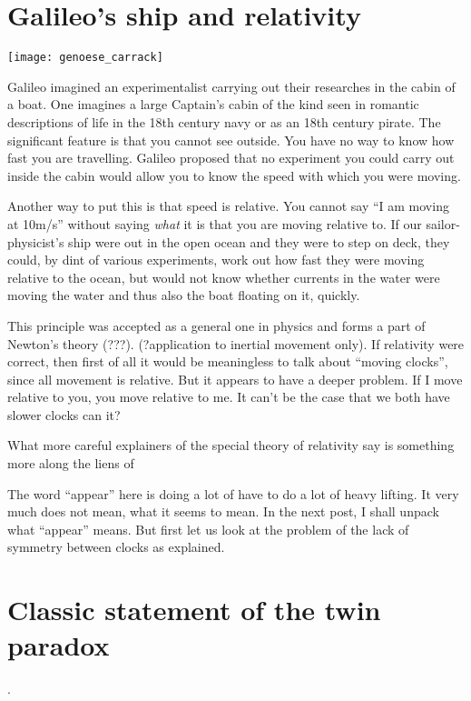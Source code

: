 \documentclass{report}
\begin{document}
\section{Galileo's ship and relativity}
\texttt{[image: genoese\_carrack]}

Galileo imagined an experimentalist carrying out their researches in the cabin of a boat. One imagines a large Captain's cabin of the kind seen in romantic descriptions of life in the 18th century navy or as an 18th century pirate. The significant feature is that you cannot see outside. You have no way to know how fast you are travelling. Galileo proposed that no experiment you could carry out inside the cabin would allow you to know the speed with which you were moving.

Another way to put this is that speed is relative. You cannot say ``I am moving at 10m/s'' without saying {\em what} it is that you are moving relative to. If our sailor-physicist's ship were out in the open ocean and they were to step on deck, they could, by dint of various experiments, work out how fast they were moving relative to the ocean, but would not know whether currents in the water were moving the water and thus also the boat floating on it, quickly.

This principle was accepted as a general one in physics and forms a part of Newton's theory (???). (?application to inertial movement only). If relativity were correct, then first of all it would be meaningless to talk about ``moving clocks'', since all movement is relative. But it appears to have a deeper problem. If I move relative to you, you move relative to me. It can't be the case that we both have slower clocks can it?

What more careful explainers of the special theory of relativity say is something more along the liens of 


The word ``appear'' here is doing a lot of have to do a lot of heavy lifting. It very much does not mean, what it seems to mean. In the next post, I shall unpack what ``appear'' means. But first let us look at the problem of the lack of symmetry between clocks as explained.

\section*{Classic statement of the twin paradox}.
\end{document}
